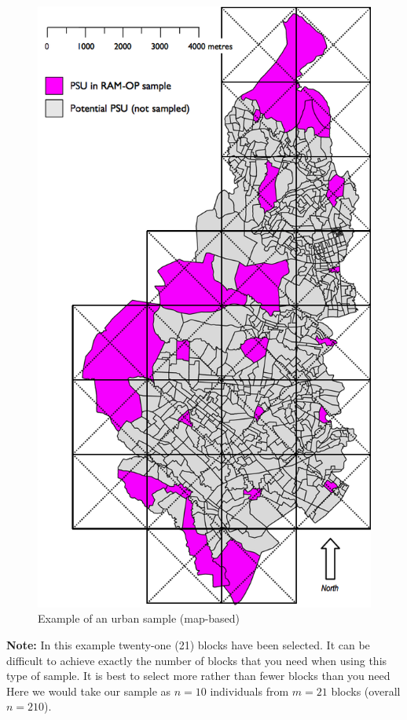 \documentclass[12pt,a4paper]{book}
\theoremstyle{definition}
\theoremstyle{definition}
\theoremstyle{definition}
\theoremstyle{remark}
\begin{document}
\begin{figure}[H]

{\centering \includegraphics[width=800pt]{figures/mapSample5} 

}

\caption{Example of an urban sample (map-based)}\label{fig:sample9}
\end{figure}

\textbf{Note:} In this example twenty-one (21) blocks have been
selected. It can be difficult to achieve exactly the number of blocks
that you need when using this type of sample. It is best to select more
rather than fewer blocks than you need Here we would take our sample as
\(n = 10\) individuals from \(m = 21\) blocks (overall \(n = 210\)).
\end{document}
